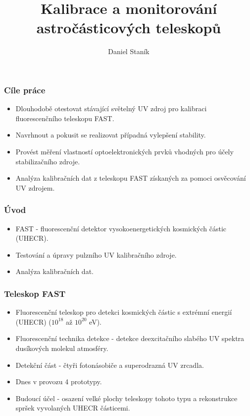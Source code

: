 \documentclass{beamer}
\title{Kalibrace a monitorování astročásticových teleskopů}
\author{Daniel Staník}
\institute{
SLO}
\date{\displaydate{date}}
\begin{document}
\begin{frame}

{
\titlepage
}
\end{frame}



\begin{frame}
\frametitle{Cíle práce}
\begin{itemize}
 \item Dlouhodobě otestovat stávající světelný UV zdroj pro kalibraci fluorescenčního teleskopu FAST. 
 \item Navrhnout a pokusit se realizovat případná vylepšení stability. 
 \item Provést měření vlastností optoelektronických prvků vhodných pro účely stabilizačního zdroje.
 \item Analýza kalibračních dat z teleskopu FAST získaných za pomoci osvěcování UV zdrojem.
\end{itemize}

\end{frame}



\begin{frame}
\frametitle{Úvod}
\begin{itemize}
 \item FAST - fluorescenční detektor vysokoenergetických kosmických částic (UHECR).  
 \item Testování a úpravy pulzního UV kalibračního zdroje.
 \item Analýza kalibračních dat.
\end{itemize}

\end{frame}






\begin{frame}
\frametitle{Teleskop FAST}
\begin{itemize}
 \item Fluorescenční teleskop pro detekci kosmických částic s extrémní energií (UHECR) ($10^{18}$ až $10^{20}$ eV).
 \item Fluorescenční technika detekce - detekce deexcitačního slabého UV spektra dusíkových molekul atmosféry.
 \item Detekční část - čtyři fotonásobiče a superodrazná UV zrcadla.
 \item Dnes v provozu 4 prototypy.
 \item Budoucí účel - osazení velké plochy teleskopy tohoto typu a rekonstrukce spršek vyvolaných UHECR částicemi.
\end{itemize}

\end{frame}
\end{document}
